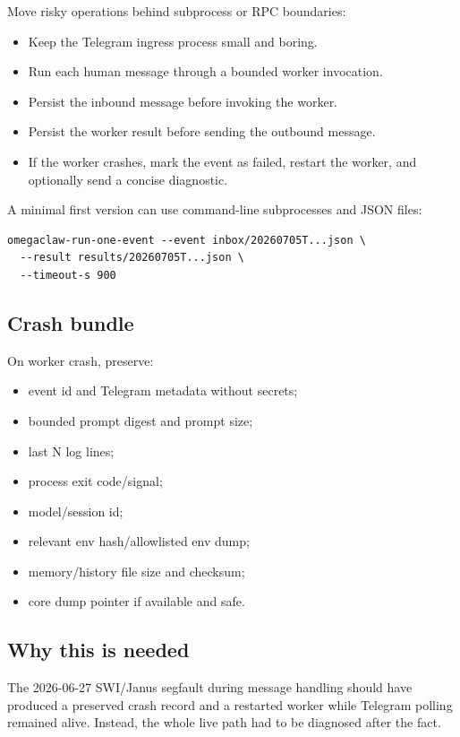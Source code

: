 \documentclass[11pt]{article}
\begin{document}
Move risky operations behind subprocess or RPC boundaries:

\begin{itemize}
  \item Keep the Telegram ingress process small and boring.
  \item Run each human message through a bounded worker invocation.
  \item Persist the inbound message before invoking the worker.
  \item Persist the worker result before sending the outbound message.
  \item If the worker crashes, mark the event as failed, restart the worker, and optionally send a concise diagnostic.
\end{itemize}

A minimal first version can use command-line subprocesses and JSON files:

\begin{Verbatim}[fontsize=\small]
omegaclaw-run-one-event --event inbox/20260705T...json \
  --result results/20260705T...json \
  --timeout-s 900
\end{Verbatim}

\subsection{Crash bundle}

On worker crash, preserve:

\begin{itemize}
  \item event id and Telegram metadata without secrets;
  \item bounded prompt digest and prompt size;
  \item last N log lines;
  \item process exit code/signal;
  \item model/session id;
  \item relevant env hash/allowlisted env dump;
  \item memory/history file size and checksum;
  \item core dump pointer if available and safe.
\end{itemize}

\subsection{Why this is needed}

The 2026-06-27 SWI/Janus segfault during message handling should have produced a preserved crash record and a restarted worker while Telegram polling remained alive. Instead, the whole live path had to be diagnosed after the fact.
\end{document}

